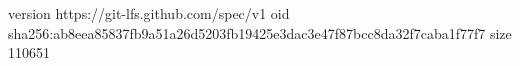 version https://git-lfs.github.com/spec/v1
oid sha256:ab8eea85837fb9a51a26d5203fb19425e3dac3e47f87bcc8da32f7caba1f77f7
size 110651
